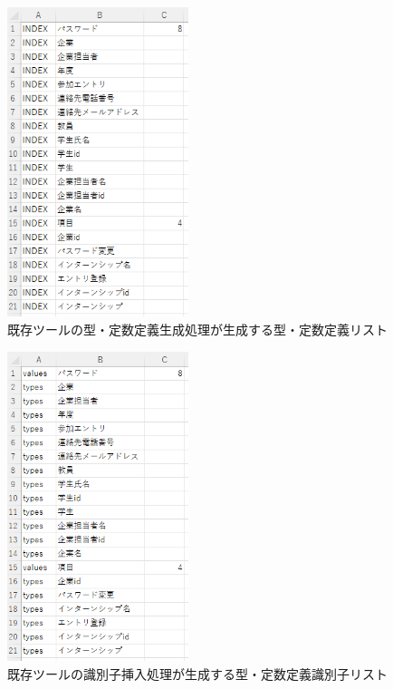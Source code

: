 \begin{figure}[h]
    \begin{center}
        \includegraphics[width=200]{image/exis_katateisu_list.png}
        \caption{既存ツールの型・定数定義生成処理が生成する型・定数定義リスト}
        \label{fig:exis_katateisu_list}
    \end{center}
\end{figure}

\begin{figure}[tp]
    \begin{center}
        \includegraphics[width=200]{image/exis_katateisu_id_list.PNG}
        \caption{既存ツールの識別子挿入処理が生成する型・定数定義識別子リスト}
        \label{fig:exis_katateisu_id_list}
    \end{center}
\end{figure}


